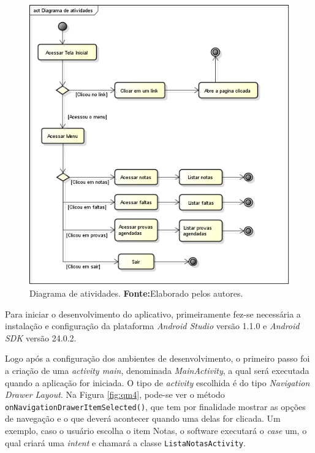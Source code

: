 		\pagebreak
		\begin{figure}[h!]
			\centerline{\includegraphics[scale=0.5]{./imagens/2_q_metodologico/qm3.png}}
			\caption[Diagrama de atividades]{Diagrama de atividades.
			 \textbf{Fonte:}Elaborado pelos autores.}
			\label{fig:qm3}
		\end{figure}
		
	
	\par Para iniciar o desenvolvimento do aplicativo, primeiramente fez-se
necessária a instalação e configuração da plataforma \textit{Android Studio}
versão 1.1.0 e \textit{Android SDK} versão 24.0.2.

	\par Logo após a configuração dos ambientes de desenvolvimento, o primeiro
passo foi a criação de uma \textit{activity main}, denominada
\textit{MainActivity}, a qual será executada quando a aplicação for iniciada. O
tipo de \textit{activity} escolhida é do tipo \textit{Navigation Drawer
Layout}. Na Figura \ref{fig:qm4}, pode-se ver o método
\texttt{onNavigationDrawerItemSelected()}, que tem por finalidade mostrar as
opções de navegação e o que deverá acontecer quando uma delas for clicada. Um
exemplo, caso o usuário escolha o item Notas, o software executará o
\textit{case} um, o qual criará uma \textit{intent} e chamará a classe
\texttt{ListaNotasActivity}.
	
